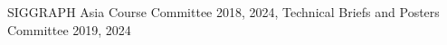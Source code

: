 \documentclass[margin,line]{res}
\begin{document}
\begin{resume}
\vspace*{-.15in}
SIGGRAPH Asia Course Committee 2018, 2024, Technical Briefs and Posters Committee 2019, 2024







\end{resume}
\end{document}
